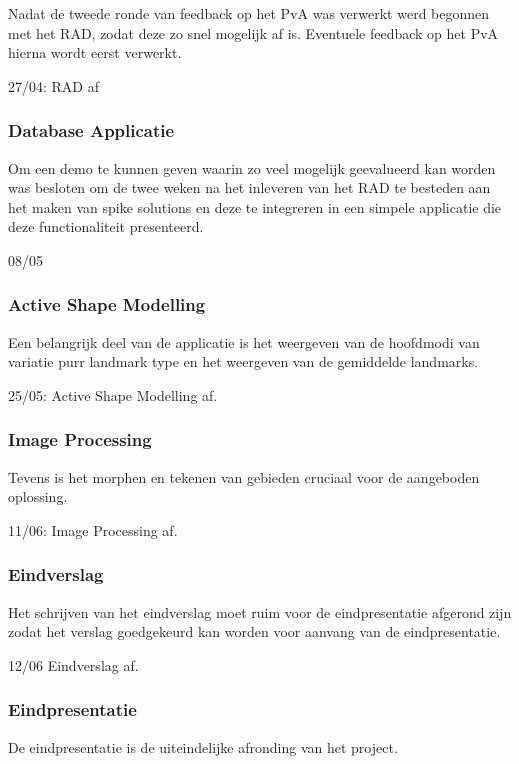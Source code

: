 Nadat de tweede ronde van feedback op het PvA was verwerkt werd begonnen met
het RAD, zodat deze zo snel mogelijk af is. Eventuele feedback op het PvA
hierna wordt eerst verwerkt.

27/04: RAD af

\subsubsection{Database Applicatie}

Om een demo te kunnen geven waarin zo veel mogelijk geevalueerd kan worden was
besloten om de twee weken na het inleveren van het RAD te besteden aan
het maken van spike solutions en deze te integreren in een simpele applicatie
die deze functionaliteit presenteerd.

08/05

\subsubsection{Active Shape Modelling}

Een belangrijk deel van de applicatie is het weergeven van de hoofdmodi van
variatie purr landmark type en het weergeven van de gemiddelde landmarks.

25/05: Active Shape Modelling af.

\subsubsection{Image Processing}

Tevens is het morphen en tekenen van gebieden cruciaal voor de aangeboden
oplossing.

11/06: Image Processing af.

\subsubsection{Eindverslag}

Het schrijven van het eindverslag moet ruim voor de eindpresentatie afgerond zijn
zodat het verslag goedgekeurd kan worden voor aanvang van de eindpresentatie.

12/06 Eindverslag af.

\subsubsection{Eindpresentatie}

De eindpresentatie is de uiteindelijke afronding van het project. 

